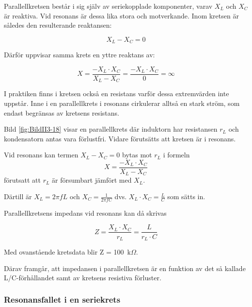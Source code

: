 Parallellkretsen består i sig själv av seriekopplade komponenter, varav
\(X_L\) och \(X_C\) är reaktiva.
Vid resonans är dessa lika stora och motverkande.
Inom kretsen är således den resulterande reaktansen:

\[X_L - X_C = 0\]

Därför uppvisar samma krets en yttre reaktans av:

\[
  X = \frac{-X_L \cdot X_C}{X_L - X_C}
  = \frac{-X_L \cdot X_C}{0}
  = \infty
\]

I praktiken finns i kretsen också en resistans varför dessa extremvärden inte
uppstår.
Inne i en parallellkrets i resonans cirkulerar alltså en stark ström,
som endast begränsas av kretsens resistans.

Bild \ref{fig:BildII3-18} visar en parallellkrets där induktorn har resistansen
\(r_L\) och kondensatorn antas vara förlustfri.
Vidare förutsätts att kretsen är i resonans.

Vid resonans kan termen \(X_L - X_C = 0\) bytas mot \(r_L\) i formeln
\[X = \frac{-X_L \cdot X_C}{X_L - X_C}\] förutsatt att \(r_L\) är försumbart
jämfört med \(X_L\).

Därtill är \(X_L = 2\pi fL\) och \(X_C = \frac{1}{2\pi fC}\) dvs.
\(X_L \cdot X_C = \frac{L}{C}\) som sätts in.

Parallellkretsens impedans vid resonans kan då skrivas

\[
Z = \frac{X_L \cdot X_C}{r_L} = \frac{L}{r_L \cdot C}
\]

Med ovanstående kretsdata blir Z = 100~k\(\Omega\).

Därav framgår, att impedansen i parallellkretsen är en funktion av det så
kallade L/C-förhållandet samt av kretsens resistiva förluster.

\subsubsection{Resonansfallet i en seriekrets}
\label{serieresonans}


